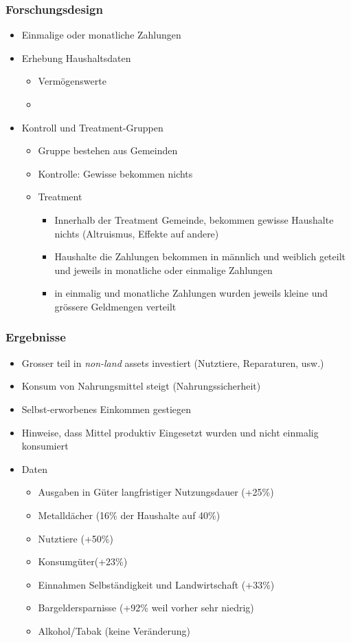 \subsubsection{Forschungsdesign}
\begin{itemize}
    \item Einmalige oder monatliche Zahlungen
    \item Erhebung Haushaltsdaten
    \begin{itemize}
        \item Vermögenswerte
        \item 
    \end{itemize}
    \item Kontroll und Treatment-Gruppen
    \begin{itemize}
        \item Gruppe bestehen aus Gemeinden
        \item Kontrolle: Gewisse bekommen nichts
        \item Treatment
        \begin{itemize}
            \item Innerhalb der Treatment Gemeinde, bekommen gewisse Haushalte nichts (Altruismus, Effekte auf andere)
            \item Haushalte die Zahlungen bekommen in männlich und weiblich geteilt und jeweils in monatliche oder einmalige Zahlungen
            \item in einmalig und monatliche Zahlungen wurden jeweils kleine und grössere Geldmengen verteilt 
        \end{itemize} 
    \end{itemize}
\end{itemize}
\subsubsection{Ergebnisse}
\begin{itemize}
    \item Grosser teil in \textit{non-land} assets investiert (Nutztiere, Reparaturen, usw.)
    \item Konsum von Nahrungsmittel steigt  (Nahrungssicherheit)
    \item Selbst-erworbenes Einkommen gestiegen 
    \item Hinweise, dass Mittel produktiv Eingesetzt wurden und nicht einmalig konsumiert  
    \item Daten
    \begin{itemize}
        \item Ausgaben in Güter langfristiger Nutzungsdauer (+25\%)
        \item Metalldächer (16\% der Haushalte auf 40\%)
        \item Nutztiere (+50\%)
        \item Konsumgüter(+23\%)
        \item Einnahmen Selbständigkeit und Landwirtschaft (+33\%)
        \item Bargeldersparnisse  (+92\% weil vorher sehr niedrig)
        \item Alkohol/Tabak (keine Veränderung)
    \end{itemize}
\end{itemize}

